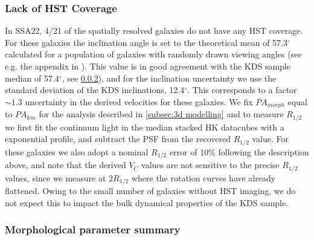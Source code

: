\documentclass[fleqn,usenatbib]{mn2e}
\begin{document}
\subsubsection{Lack of HST Coverage}\label{subsubsection:lack_of_hst}
In SSA22, 4/21 of the spatially resolved galaxies do not have any HST coverage.
For these galaxies the inclination angle is set to the theoretical mean of 57.3$^{\circ}$ calculated for a population of galaxies with randomly drawn viewing angles (see e.g. the appendix in \cite{Law2009}).
This value is in good agreement with the KDS sample median of 57.4$^{\circ}$, see \cref{subsubsection:morph_param_summary}), and for the inclination uncertainty we use the standard deviation of the KDS inclinations, 12.4$^{\circ}$.
This corresponds to a factor $\sim1.3$ uncertainty in the derived velocities for these galaxies.
We fix $PA_{morph}$ equal to $PA_{kin}$ for the analysis described in \cref{subsec:3d modelling} and to measure $R_{1/2}$ we first fit the continuum light in the median stacked HK datacubes with a exponential profile, and subtract the PSF from the recovered $R_{1/2}$ value.
For these galaxies we also adopt a nominal $R_{1/2}$ error of 10$\%$ following the description above, and note that the derived $V_{C}$ values are not sensitive to the precise $R_{1/2}$ values, since we measure at $2R_{1/2}$ where the rotation curves have already flattened.
Owing to the small number of galaxies without HST imaging, we do not expect this to impact the bulk dynamical properties of the KDS sample.

\subsubsection{Morphological parameter summary}\label{subsubsection:morph_param_summary}
\end{document}
